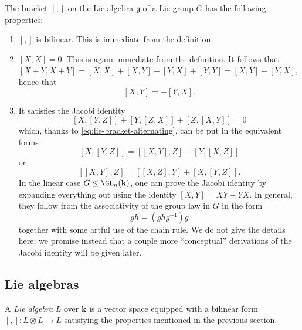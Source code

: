 \documentclass[reqno]{amsart} 
\begin{document}
The bracket $[,]$
on the Lie algebra $\mathfrak{g}$ of a Lie group $G$
has the following properties:
\begin{enumerate}
\item $[,]$ is bilinear.  This is immediate from the definition
\item $[X,X] = 0$.  This is again immediate from the definition.
  It follows that
  $[X+Y,X+Y] = [X,X]  + [X,Y] + [Y,X] + [Y,Y]
  = [X,Y] + [Y,X]$,
  hence that
  \begin{equation}\label{eq:lie-bracket-alternating}
    {}    [X,Y] = - [Y,X].
  \end{equation}
\item It satisfies the Jacobi identity
  \begin{equation}\label{eq:jacobi-identity}
    {}    [X,[Y,Z]]
    +
    {}    [Y,[Z,X]]
    +
    {}    [Z,[X,Y]]
    = 0
  \end{equation}
  which, thanks to \eqref{eq:lie-bracket-alternating},
  can be put in the equivalent forms
  \begin{equation*}
    {}    [X,[Y,Z]]
    =[[X,Y],Z]
    + [Y,[X,Z]]
  \end{equation*}
  or
  \begin{equation*}
    {}[[X,Y],Z]= [[X,Z],Y] + [X,[Y,Z]].
  \end{equation*}
  In the linear case $G \leq \GL_n(\mathbf{k})$,
  one can prove the Jacobi identity
  by expanding everything out using the identity $[X,Y] = X Y -
  Y X$.
  In general,
  they follow
  from the associativity of the group law in $G$
  in the form
  \begin{equation*}
    g h = (g h g^{-1}) g
  \end{equation*}
  together with some artful use of the chain rule.  We do not
  give the details here; we promise instead that a couple more
  ``conceptual'' derivations of the Jacobi identity will be
  given later.
\end{enumerate}

\subsection{Lie algebras}
\label{sec:org0f4ac0a}
\begin{definition}
  A \emph{Lie algebra} $L$ over $\mathbf{k}$ is a
  vector space
  equipped with a bilinear form $[,] : L \otimes L \rightarrow
  L$
  satisfying the properties mentioned in the previous section.
\end{definition}
\end{document}
